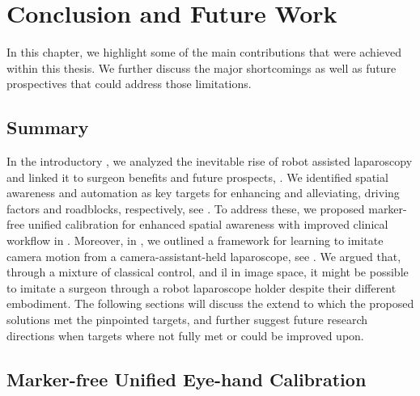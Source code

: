 \chapter[Conclusions and Future Work]{Conclusion and Future Work}
\label{chap:conclusion}
\minitoc

\newpage

In this chapter, we highlight some of the main contributions that were achieved within this thesis. We further discuss the major shortcomings as well as future prospectives that could address those limitations. 

\section{Summary}
In the introductory , we analyzed the inevitable rise of robot assisted laparoscopy and linked it to surgeon benefits and future prospects, . We identified spatial awareness and automation as key targets for enhancing and alleviating, driving factors and roadblocks, respectively, see . To address these, we proposed marker-free unified calibration for enhanced spatial awareness with improved clinical workflow in . Moreover, in , we outlined a framework for learning to imitate camera motion from a camera-assistant-held laparoscope, see . We argued that, through a mixture of classical control, and \gls{il} in image space, it might be possible to imitate a surgeon through a robot laparoscope holder despite their different embodiment. The following sections will discuss the extend to which the proposed solutions met the pinpointed targets, and further suggest future research directions when targets where not fully met or could be improved upon.

\section{Marker-free Unified Eye-hand Calibration}
\label{con:sec:marker_free}
